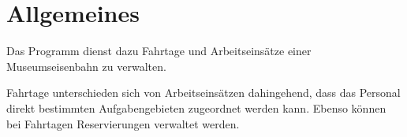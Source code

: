 \chapter{Allgemeines}
Das Programm dienst dazu Fahrtage und Arbeitseinsätze einer Museumseisenbahn zu verwalten.

Fahrtage unterschieden sich von Arbeitseinsätzen dahingehend, dass das Personal direkt bestimmten Aufgabengebieten zugeordnet werden kann. Ebenso können bei Fahrtagen Reservierungen verwaltet werden.
